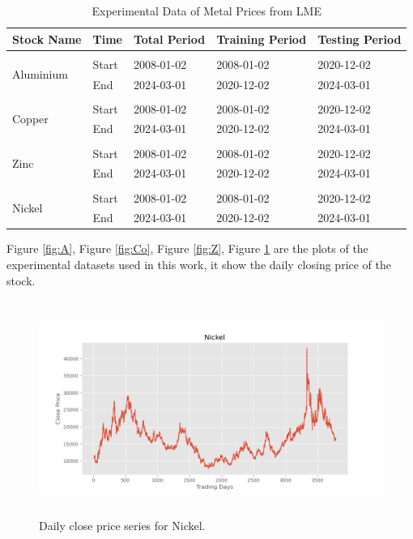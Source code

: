 \documentclass{ws-ijait}
\begin{document}
\begin{table}[!htbp]
	\begin{center}
		\begin{tabular}{ p{1.5cm}p{1cm}p{2cm}p{2cm}p{2cm}  } \hline
			
			Stock Name &Time &Total Period &Training Period &Testing Period\\ \hline \hline \\
			\multirow{2}{*}{Aluminium}&Start & 2008-01-02  &2008-01-02  &2020-12-02 \\
			&End & 2024-03-01 &2020-12-02 &2024-03-01\\ \hline\\
			\multirow{2}{*}{Copper}&Start & 2008-01-02  &2008-01-02  &2020-12-02 \\
			&End & 2024-03-01 &2020-12-02 &2024-03-01\\ \hline\\
			\multirow{2}{*}{Zinc}&Start & 2008-01-02  &2008-01-02  &2020-12-02 \\
			&End & 2024-03-01 &2020-12-02 &2024-03-01\\ \hline\\
			\multirow{2}{*}{Nickel}&Start & 2008-01-02  &2008-01-02  &2020-12-02 \\
			&End & 2024-03-01 &2020-12-02 &2024-03-01\\ \hline \hline
		\end{tabular}
		\caption{Experimental Data of Metal Prices from LME} \label{tab1}
	\end{center}
\end{table}
Figure \ref{fig:A}, Figure \ref{fig:Co}, Figure \ref{fig:Z}, Figure \ref{fig:N} are the plots of the experimental datasets used in this work, it show the daily closing price of the stock.
\begin{center}
	\begin{figure}[!htbp]
		\centering
		\includegraphics[width=15cm, height=7cm]{N.png}
		\caption{Daily close price series for Nickel.}
		\label{fig:N}
	\end{figure}
\end{center}
\end{document}

